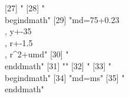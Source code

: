 [27] "%
[28] "\\begin{dmath}"                                                                                                                                                                                                                                                                                
[29] "{md}=75+0.23\\, {y}+-35\\, {r}+-1.5\\, {r}^{2}+{umd}"                                                                                                                                                                                                                                          
[30] "\\end{dmath}"                                                                                                                                                                                                                                                                                  
[31] ""                                                                                                                                                                                                                                                                                              
[32] "%
[33] "\\begin{dmath}"                                                                                                                                                                                                                                                                                
[34] "{md}={ms}"                                                                                                                                                                                                                                                                                     
[35] "\\end{dmath}"                                                                                                                                                                                                                                                                                  

